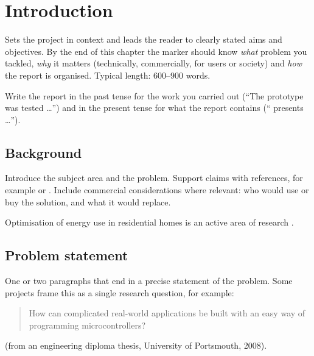 \chapter{Introduction}
\label{ch:intro}

\begin{guidance}
Sets the project in context and leads the reader to clearly stated aims and
objectives. By the end of this chapter the marker should know
\emph{what} problem you tackled, \emph{why} it matters (technically,
commercially, for users or society) and \emph{how} the report is organised.
Typical length: 600--900 words.

Write the report in the past tense for the work you carried out (\enquote{The
prototype was tested \ldots}) and in the present tense for what the report
contains (\enquote{ presents \ldots}).
\end{guidance}

\section{Background}
\label{sec:background}

\begin{guidance}
Introduce the subject area and the problem. Support claims with references,
for example \textcite{engc2020ahep} or \parencite{cross2008}. Include
commercial considerations where relevant: who would use or buy the
solution, and what it would replace.
\end{guidance}

Optimisation of energy use in residential homes is an active area of
research \parencite{bausch2014}. 

\section{Problem statement}
\label{sec:problem}

\begin{guidance}
One or two paragraphs that end in a precise statement of the problem. Some
projects frame this as a single research question, for example:
\begin{quote}
How can complicated real-world applications be built with an easy way of
programming microcontrollers?
\end{quote}
(from an engineering diploma thesis, University of Portsmouth, 2008).
\end{guidance}

